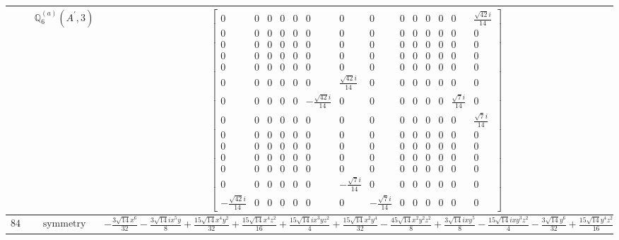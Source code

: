 \documentclass[fleqn,8pt,landscape]{jsarticle}
\begin{document}
\begin{longtable}{ccc}
$  $ & $ \mathbb{Q}_{6}^{(a)}(A^{\prime},3) $ & $ \begin{bmatrix} 0 & 0 & 0 & 0 & 0 & 0 & 0 & 0 & 0 & 0 & 0 & 0 & 0 & \frac{\sqrt{42} i}{14} \\ 0 & 0 & 0 & 0 & 0 & 0 & 0 & 0 & 0 & 0 & 0 & 0 & 0 & 0 \\ 0 & 0 & 0 & 0 & 0 & 0 & 0 & 0 & 0 & 0 & 0 & 0 & 0 & 0 \\ 0 & 0 & 0 & 0 & 0 & 0 & 0 & 0 & 0 & 0 & 0 & 0 & 0 & 0 \\ 0 & 0 & 0 & 0 & 0 & 0 & 0 & 0 & 0 & 0 & 0 & 0 & 0 & 0 \\ 0 & 0 & 0 & 0 & 0 & 0 & \frac{\sqrt{42} i}{14} & 0 & 0 & 0 & 0 & 0 & 0 & 0 \\ 0 & 0 & 0 & 0 & 0 & - \frac{\sqrt{42} i}{14} & 0 & 0 & 0 & 0 & 0 & 0 & \frac{\sqrt{7} i}{14} & 0 \\ 0 & 0 & 0 & 0 & 0 & 0 & 0 & 0 & 0 & 0 & 0 & 0 & 0 & \frac{\sqrt{7} i}{14} \\ 0 & 0 & 0 & 0 & 0 & 0 & 0 & 0 & 0 & 0 & 0 & 0 & 0 & 0 \\ 0 & 0 & 0 & 0 & 0 & 0 & 0 & 0 & 0 & 0 & 0 & 0 & 0 & 0 \\ 0 & 0 & 0 & 0 & 0 & 0 & 0 & 0 & 0 & 0 & 0 & 0 & 0 & 0 \\ 0 & 0 & 0 & 0 & 0 & 0 & 0 & 0 & 0 & 0 & 0 & 0 & 0 & 0 \\ 0 & 0 & 0 & 0 & 0 & 0 & - \frac{\sqrt{7} i}{14} & 0 & 0 & 0 & 0 & 0 & 0 & 0 \\ - \frac{\sqrt{42} i}{14} & 0 & 0 & 0 & 0 & 0 & 0 & - \frac{\sqrt{7} i}{14} & 0 & 0 & 0 & 0 & 0 & 0 \end{bmatrix} $ \\ \hline
$ 847 $ & $ \text{symmetry} $ & $ - \frac{3 \sqrt{14} x^{6}}{32} - \frac{3 \sqrt{14} i x^{5} y}{8} + \frac{15 \sqrt{14} x^{4} y^{2}}{32} + \frac{15 \sqrt{14} x^{4} z^{2}}{16} + \frac{15 \sqrt{14} i x^{3} y z^{2}}{4} + \frac{15 \sqrt{14} x^{2} y^{4}}{32} - \frac{45 \sqrt{14} x^{2} y^{2} z^{2}}{8} + \frac{3 \sqrt{14} i x y^{5}}{8} - \frac{15 \sqrt{14} i x y^{3} z^{2}}{4} - \frac{3 \sqrt{14} y^{6}}{32} + \frac{15 \sqrt{14} y^{4} z^{2}}{16} $ \\

\end{longtable}
\end{document}
